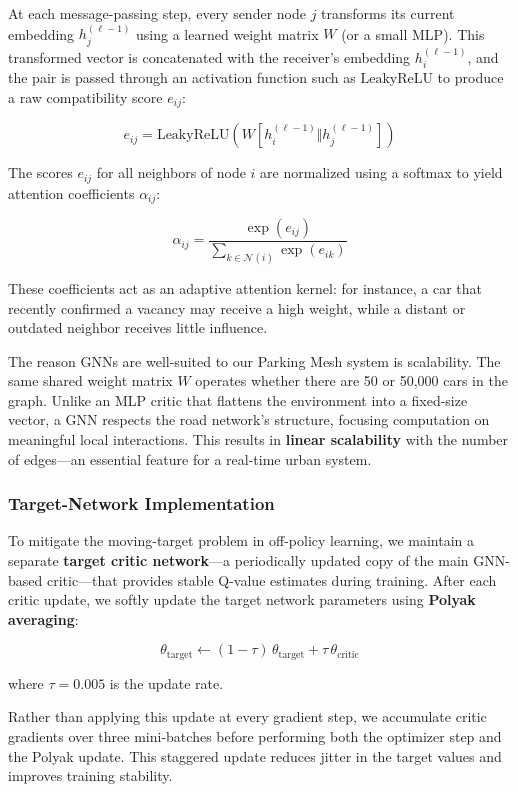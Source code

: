 At each message-passing step, every sender node \( j \) transforms its current embedding \( h_j^{(\ell - 1)} \) using a learned weight matrix \( W \) (or a small MLP). This transformed vector is concatenated with the receiver’s embedding \( h_i^{(\ell - 1)} \), and the pair is passed through an activation function such as \(\text{LeakyReLU}\) to produce a raw compatibility score \( e_{ij} \):

\[
e_{ij} = \text{LeakyReLU}(W[h_i^{(\ell - 1)} \Vert h_j^{(\ell - 1)}])
\]

The scores \( e_{ij} \) for all neighbors of node \( i \) are normalized using a softmax to yield attention coefficients \( \alpha_{ij} \):

\[
\alpha_{ij} = \frac{\exp(e_{ij})}{\sum_{k \in \mathcal{N}(i)} \exp(e_{ik})}
\]

These coefficients act as an adaptive attention kernel: for instance, a car that recently confirmed a vacancy may receive a high weight, while a distant or outdated neighbor receives little influence.

The reason GNNs are well-suited to our Parking Mesh system is scalability. The same shared weight matrix \( W \) operates whether there are 50 or 50{,}000 cars in the graph. Unlike an MLP critic that flattens the environment into a fixed-size vector, a GNN respects the road network’s structure, focusing computation on meaningful local interactions. This results in \textbf{linear scalability} with the number of edges—an essential feature for a real-time urban system.

\subsubsection*{Target-Network Implementation}

To mitigate the moving-target problem in off-policy learning, we maintain a separate \textbf{target critic network}—a periodically updated copy of the main GNN-based critic—that provides stable Q-value estimates during training. After each critic update, we softly update the target network parameters using \textbf{Polyak averaging}:

\[
\theta_{\text{target}} \leftarrow (1 - \tau)\,\theta_{\text{target}} + \tau\,\theta_{\text{critic}}
\]

where \( \tau = 0.005 \) is the update rate.

Rather than applying this update at every gradient step, we accumulate critic gradients over three mini-batches before performing both the optimizer step and the Polyak update. This staggered update reduces jitter in the target values and improves training stability.

